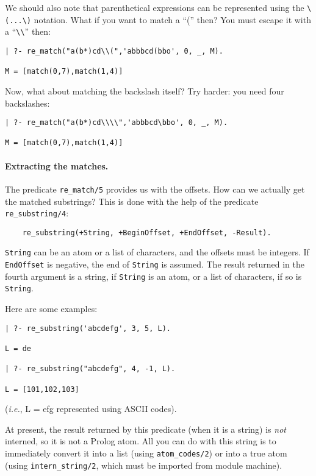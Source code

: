 We should also note that parenthetical expressions can be represented
using the \verb|\(...\)| notation. What if you want to match a ``('' then?
You must escape it with a ``\verb|\\|'' then:
\begin{verbatim}
| ?- re_match("a(b*)cd\\(",'abbbcd(bbo', 0, _, M).

M = [match(0,7),match(1,4)]
\end{verbatim}
Now, what about matching the backslash itself? Try harder: you need four
backslashes: 
\begin{verbatim}
| ?- re_match("a(b*)cd\\\\",'abbbcd\bbo', 0, _, M).

M = [match(0,7),match(1,4)]
\end{verbatim}

\paragraph{Extracting the matches.}
The predicate \verb|re_match/5| provides us with the offsets. How can we
actually get the matched substrings? This is done with the help of the
predicate \verb|re_substring/4|:
\begin{verbatim}
    re_substring(+String, +BeginOffset, +EndOffset, -Result).
\end{verbatim}
{\tt String} can be an atom or a list of characters, and the offsets must
be integers.  If {\tt EndOffset} is negative, the end of {\tt String} is
assumed.  The result returned in the fourth
argument is a string, if {\tt String} is an atom, or a list of characters,
if so is {\tt String}.

Here are some examples: 
\begin{verbatim}
| ?- re_substring('abcdefg', 3, 5, L).

L = de

| ?- re_substring("abcdefg", 4, -1, L).

L = [101,102,103]
\end{verbatim}
({\it i.e.}, L = efg represented using ASCII codes).

At present, the result returned by this predicate (when it is a string) is
\emph{not} interned, so it is not a Prolog atom.  All you can do with this
string is to immediately convert it into a list (using {\tt atom\_codes/2})
or into a true atom (using {\tt intern\_string/2}, which must be imported
from module machine).

